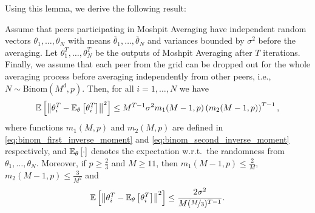 Using this lemma, we derive the following result:
\begin{theorem}\label{thm:quality_of_avg_supp}
    Assume that peers participating in Moshpit Averaging have independent random vectors $\theta_1,\ldots,\theta_N$ with means $\overline{\theta}_1,\ldots,\overline{\theta}_N$ and variances bounded by $\sigma^2$ before the averaging. Let $\theta_1^T,\ldots,\theta_N^T$ be the outputs of Moshpit Averaging after $T$ iterations. Finally, we assume that each peer from the grid can be dropped out for the whole averaging process before averaging independently from other peers, i.e., $N \sim \text{Binom}(M^d,p)$. Then, for all $i = 1,\ldots,N$ we have
    \begin{equation}
        \mathbb{E}\left[\left\|\theta_i^T - \mathbb{E}_{\theta}\left[\theta_i^T\right]\right\|^2\right] \leq M^{T-1}\sigma^2 m_1(M-1,p)\left(m_2(M-1,p)\right)^{T-1},\label{eq:variance_bound_supp}
    \end{equation}
    where functions $m_1(M,p)$ and $m_2(M,p)$ are defined in \eqref{eq:binom_first_inverse_moment} and \eqref{eq:binom_second_inverse_moment} respectively, and $\mathbb{E}_\theta\left[\cdot\right]$ denotes the expectation w.r.t.\ the randomness from $\theta_1,\ldots,\theta_N$. Moreover, if $p \ge \frac{2}{3}$ and $M \ge 11$, then $m_1(M-1,p) \le \frac{2}{M}$, $m_2(M-1,p) \le \frac{3}{M^2}$ and 
    \begin{equation}
        \mathbb{E}\left[\left\|\theta_i^T - \mathbb{E}_{\theta}\left[\theta_i^T\right]\right\|^2\right] \leq \frac{2\sigma^2}{M(\nicefrac{M}{3})^{T-1}}.\label{eq:variance_bound_2_supp}
    \end{equation}
\end{theorem}
